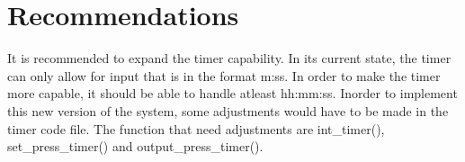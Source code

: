 \documentclass{article}
\begin{document}
\section{Recommendations}
It is recommended to expand the timer capability.  In its current state, the timer
can only allow for input that is in the format m:ss.  In order to make the timer more
capable, it should be able to handle atleast hh:mm:ss.  Inorder to implement this
new version of the system, some adjustments would have to be made in the timer code file.
The function that need adjustments are int\_timer(), set\_press\_timer() and 
output\_press\_timer().
\newline
\end{document}
